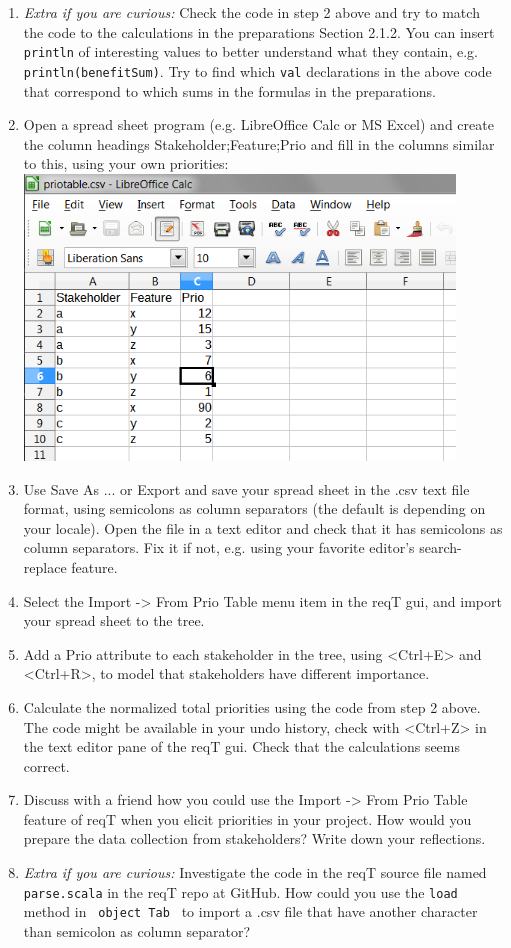 \documentclass[11pt]{article}
\begin{document}
\begin{framed}
\begin{enumerate}
\item {\it Extra if you are curious:} Check the code in step 2 above and try to match the code to the calculations in the preparations Section 2.1.2. You can insert \verb+println+ of interesting values to better understand what they contain, e.g. \verb+println(benefitSum)+. Try to find which {\verb+val+} declarations in the above code that correspond to which sums in the formulas in the preparations. 
\item Open a spread sheet program (e.g. LibreOffice Calc or MS Excel) and create the column headings Stakeholder;Feature;Prio and fill in the columns similar to this, using your own priorities:
\includegraphics[width=0.9\textwidth]{spread-sheet.png}
\item Use Save As ... or Export and save your spread sheet in the .csv text file format, using semicolons as column separators (the default is depending on your locale). Open the file in a text editor and check that it has semicolons as column separators. Fix it if not, e.g. using your favorite editor's search-replace feature.
\item Select the Import -> From Prio Table menu item in the reqT gui, and import your spread sheet to the tree.
\item Add a Prio attribute to each stakeholder in the tree, using <Ctrl+E> and <Ctrl+R>, to model that stakeholders have different importance. 
\item Calculate the normalized total priorities using the code from step 2 above. The code might be available in your undo history, check with <Ctrl+Z> in the text editor pane of the reqT gui. Check that the calculations seems correct.
\item Discuss with a friend how you could use the Import -> From Prio Table feature of reqT when you elicit priorities in your project. How would you prepare the data collection from stakeholders? Write down your reflections.
\vspace{12em}
\item {\it Extra if you are curious:} Investigate the code in the reqT source file named \verb+parse.scala+ in the reqT repo at GitHub. How could you use the \verb+load+ method in \verb+ object Tab + to import a .csv file that have another character than semicolon as column separator? 
\end{enumerate}


\end{framed}
\end{document}
